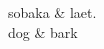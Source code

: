 \documentclass[a4paper]{article}
\begin{document}
\begin{dependency}
\begin{deptext}
sobaka \& laet. \\
dog \& bark \\
\end{deptext}
\end{dependency}
\end{document}
